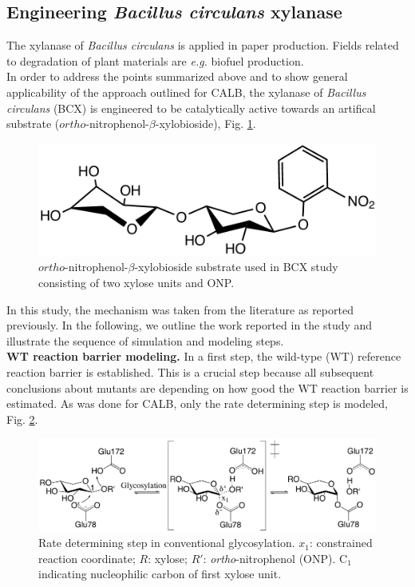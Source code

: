 \subsection{Engineering \textit{Bacillus circulans} xylanase}
The xylanase of \textit{Bacillus circulans} is applied in paper production\cite{bajpai1999application, buchert1994application}.
Fields related to degradation of plant materials are \textit{e.g.} biofuel production.\\
In order to address the points summarized above and to show general applicability of the approach outlined for CALB, the xylanase of \textit{Bacillus circulans} (BCX) is engineered to be catalytically active towards an artifical substrate ($ortho$-nitrophenol-$\beta$-xylobioside), Fig. \ref{fig:substrate}.
\begin{figure}[htbp] 
\centering
\includegraphics[width=0.85\linewidth]{substrate.pdf}
\caption{
$ortho$-nitrophenol-$\beta$-xylobioside substrate used in BCX study consisting of two xylose units and ONP.
}
\label{fig:substrate}
\end{figure}
In this study, the mechanism was taken from the literature as reported previously\cite{joshi2000hydrogen,joshi2001dissecting}.
In the following, we outline the work reported in the study and illustrate the sequence of simulation and modeling steps.\\
\textbf{WT reaction barrier modeling.}
In a first step, the wild-type (WT) reference reaction barrier is established.
This is a crucial step because all subsequent conclusions about mutants are depending on how good the WT reaction barrier is estimated.
As was done for CALB, only the rate determining step is modeled, Fig. \ref{fig:bcx_mechanism}.
\begin{figure}[htbp] 
\centering
\includegraphics[width=1.0\linewidth]{mechanism.pdf}
\caption{
Rate determining step in conventional glycosylation. $x_1$: constrained reaction coordinate; $R$: xylose; 
$R'$: \textit{ortho}-nitrophenol (ONP).
C$_1$ indicating nucleophilic carbon of first xylose unit\cite{hediger2013computational}.
}
\label{fig:bcx_mechanism}
\end{figure}
